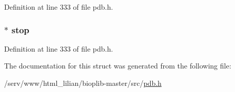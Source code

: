 Definition at line 333 of file pdb.\-h.

\hypertarget{structpdbresidue_a6d5bcaf01a13f97f8d88c5d489b48fec}{
\subsubsection[{stop}]{ $\ast$ stop}}\label{structpdbresidue_a6d5bcaf01a13f97f8d88c5d489b48fec}


Definition at line 333 of file pdb.\-h.



The documentation for this struct was generated from the following file\-:\begin{DoxyCompactItemize}
\item 
/serv/www/html\-\_\-lilian/bioplib-\/master/src/\hyperlink{pdb_8h}{pdb.\-h}\end{DoxyCompactItemize}
